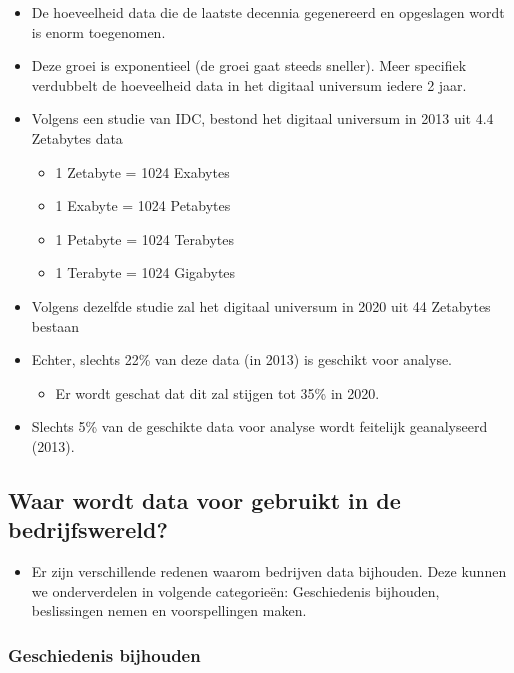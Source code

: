 \documentclass[]{tufte-book}
\providecommand{\tightlist}{%
  \setlength{\itemsep}{0pt}\setlength{\parskip}{0pt}}
\begin{document}
\begin{itemize}
\tightlist
\item
  De hoeveelheid data die de laatste decennia gegenereerd en opgeslagen wordt is enorm toegenomen.
\item
  Deze groei is exponentieel (de groei gaat steeds sneller). Meer specifiek verdubbelt de hoeveelheid data in het digitaal universum iedere 2 jaar.
\item
  Volgens een studie van IDC, bestond het digitaal universum in 2013 uit 4.4 Zetabytes data

  \begin{itemize}
  \tightlist
  \item
    1 Zetabyte = 1024 Exabytes
  \item
    1 Exabyte = 1024 Petabytes
  \item
    1 Petabyte = 1024 Terabytes
  \item
    1 Terabyte = 1024 Gigabytes
  \end{itemize}
\item
  Volgens dezelfde studie zal het digitaal universum in 2020 uit 44 Zetabytes bestaan
\item
  Echter, slechts 22\% van deze data (in 2013) is geschikt voor analyse.

  \begin{itemize}
  \tightlist
  \item
    Er wordt geschat dat dit zal stijgen tot 35\% in 2020.
  \end{itemize}
\item
  Slechts 5\% van de geschikte data voor analyse wordt feitelijk geanalyseerd (2013).
\end{itemize}

\hypertarget{waar-wordt-data-voor-gebruikt-in-de-bedrijfswereld}{%
\subsection{Waar wordt data voor gebruikt in de bedrijfswereld?}\label{waar-wordt-data-voor-gebruikt-in-de-bedrijfswereld}}

\begin{itemize}
\tightlist
\item
  Er zijn verschillende redenen waarom bedrijven data bijhouden. Deze kunnen we onderverdelen in volgende categorieën: Geschiedenis bijhouden, beslissingen nemen en voorspellingen maken.
\end{itemize}

\hypertarget{geschiedenis-bijhouden}{%
\subsubsection*{Geschiedenis bijhouden}\label{geschiedenis-bijhouden}}
\end{document}
